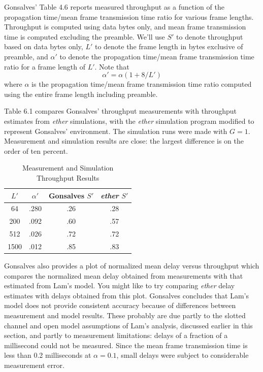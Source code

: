 Gonsalves' Table 4.6 reports measured throughput as a function of the propagation time/mean frame transmission time ratio for various frame lengths. Throughput is computed using data bytes only, and mean frame transmission time is computed excluding the preamble. We'll use $S'$ to denote throughput based on data bytes only, $L'$ to denote the frame length in bytes exclusive of preamble, and $\alpha'$ to denote the propagation time/mean frame transmission time ratio for a frame length of $L'$. Note that
\begin{equation} \alpha'=\alpha(1+8/L') \end{equation}
where $\alpha$ is the propagation time/mean frame transmission time ratio computed using the entire frame length including preamble.

Table 6.1 compares Gonsalves' throughput measurements with throughput estimates from \emph{ether} simulations, with the \emph{ether} simulation program modified to represent Gonsalves' environment. The simulation runs were made with $G=1$. Measurement and simulation results are close: the largest difference is on the order of ten percent.





\begin{table}[H]
\centering
\begin{tabular}{cccc}
$L'$ & $\alpha'$ & Gonsalves $S'$ & \emph{ether} $S'$ \\
\hline
64 & .280 & .26 & .28 \\
200 & .092 & .60 & .57 \\
512 & .026 & .72 & .72 \\
1500 & .012 & .85 & .83 \\
\end{tabular}
\caption{Measurement and Simulation Throughput Results}
\end{table}
Gonsalves also provides a plot of normalized mean delay versus throughput which compares the normalized mean delay obtained from measurements with that estimated from Lam's model. You might like to try comparing \emph{ether} delay estimates with delays obtained from this plot. Gonsalves concludes that Lam's model does not provide consistent accuracy because of differences between measurement and model results. These probably are due partly to the slotted channel and open model assumptions of Lam's analysis, discussed earlier in this section, and partly to measurement limitations: delays of a fraction of a millisecond could not be measured. Since the mean frame transmission time is less than 0.2 milliseconds at $\alpha=0.1$, small delays were subject to considerable measurement error.

